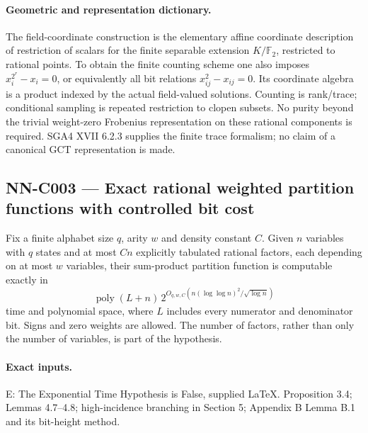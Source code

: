 \paragraph{Geometric and representation dictionary.}
The field-coordinate construction is the elementary affine coordinate description of restriction of scalars for the finite separable extension $K/\mathbb F_2$, restricted to rational points. To obtain the finite counting scheme one also imposes $x_i^{2^r}-x_i=0$, or equivalently all bit relations $x_{ij}^2-x_{ij}=0$. Its coordinate algebra is a product indexed by the actual field-valued solutions. Counting is rank/trace; conditional sampling is repeated restriction to clopen subsets. No purity beyond the trivial weight-zero Frobenius representation on these rational components is required. SGA4 XVII 6.2.3 supplies the finite trace formalism; no claim of a canonical GCT representation is made.

\subsection{NN-C003 --- Exact rational weighted partition functions with controlled bit cost}
\begin{proposition}[NN-C003]
Fix a finite alphabet size $q$, arity $w$ and density constant $C$. Given $n$ variables with $q$ states and at most $Cn$ explicitly tabulated rational factors, each depending on at most $w$ variables, their sum-product partition function is computable exactly in
\[
 \operatorname{poly}(L+n)\,
 2^{O_{q,w,C}(n(\log\log n)^2/\sqrt{\log n})}
\]
time and polynomial space, where $L$ includes every numerator and denominator bit. Signs and zero weights are allowed. The number of factors, rather than only the number of variables, is part of the hypothesis.
\end{proposition}
\paragraph{Exact inputs.}
E: The Exponential Time Hypothesis is False, supplied LaTeX. Proposition 3.4; Lemmas 4.7--4.8; high-incidence branching in Section 5; Appendix B Lemma B.1 and its bit-height method.

